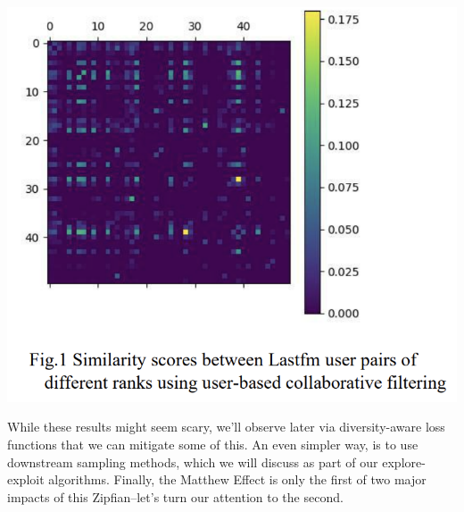 \vspace{10pt}
\includegraphics[width=\textwidth-10pt]{book-text/lastfm-matthew-effect.png}

While these results might seem scary, we'll observe later via diversity-aware loss functions that we can mitigate some of this. An even simpler way, is to use downstream sampling methods, which we will discuss as part of our explore-exploit algorithms. Finally, the Matthew Effect is only the first of two major impacts of this Zipfian–let's turn our attention to the second.